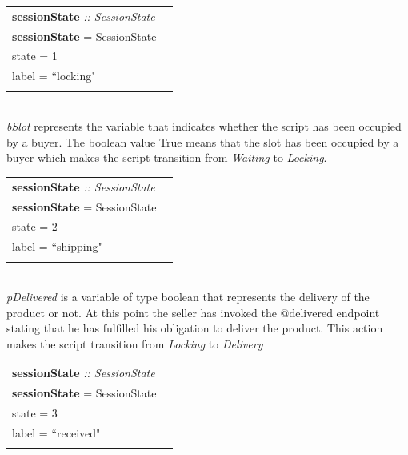 \documentclass[12pt]{article}
\begin{document}
\begin{tabular}{lr}
\textbf{sessionState} \emph{:: SessionState}\\
\textbf{sessionState}  = SessionState  \textbraceleft{}
\\ \hspace{54mm}state = 1
\\ \hspace{54mm}label = ``locking"
\\\hspace{51mm}\textbraceright{} 
\end{tabular}
\\

 \emph{bSlot} represents the variable that indicates whether the script has been occupied by a buyer. The boolean value True means that the slot has been occupied by a buyer which makes the script transition from \emph{Waiting} to \emph{Locking}.
\\

\begin{tabular}{lr}
\textbf{sessionState} \emph{:: SessionState}\\
\textbf{sessionState}  = SessionState  \textbraceleft{}
\\ \hspace{54mm}state = 2
\\ \hspace{54mm}label = ``shipping"
\\\hspace{51mm}\textbraceright{} 
\end{tabular}
\\

\emph{pDelivered} is a variable of type boolean that represents the delivery of the product or not. 
At this point the seller has invoked the @delivered endpoint stating that he has fulfilled his obligation to deliver the product. This action makes the script transition from \emph{Locking} to \emph{Delivery}
\\

\begin{tabular}{lr}
\textbf{sessionState} \emph{:: SessionState}\\
\textbf{sessionState}  = SessionState  \textbraceleft{}
\\ \hspace{54mm}state = 3
\\ \hspace{54mm}label = ``received"
\\\hspace{51mm}\textbraceright{} 
\end{tabular}
\\
\end{document}
